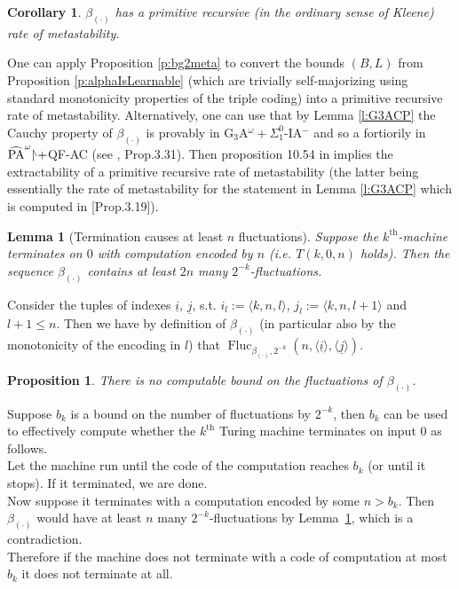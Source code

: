 \documentclass[1p]{elsarticle}
\newcommand{\res}{|\!\raisebox{1mm}{$\scriptscriptstyle\setminus$}}
\DeclareMathOperator{\Fluc}{Fluc}
\newcommand{\tup}{\underline} %
\theoremstyle{plain}
\newtheorem{lemma}[thm]{Lemma}
\newtheorem{prop}[thm]{Proposition}
\newtheorem{cor}[thm]{Corollary}
\theoremstyle{definition}
\theoremstyle{remark}
\renewenvironment{proof}[1][]{\noindent{\bf Proof{#1}. }}{\nopagebreak[4]{\hspace*{\fill}
  $\Box$              %
 }{\vspace{2ex}}}
\newcommand{\nbd}{\nobreakdash-}
\theoremstyle{definition}
\begin{document}
{\begin{cor} \label{metastability-alpha}
$\beta_{(\cdot)}$ has a primitive recursive (in the ordinary sense 
of Kleene) rate of metastability.
\end{cor}
\begin{proof} One can apply Proposition \ref{p:bg2meta} to convert 
the bounds $(B,L)$ from Proposition \ref{p:alphaIsLearnable} (which are 
trivially self-majorizing using standard monotonicity properties of the 
triple coding) into a primitive 
recursive rate of metastability. Alternatively, one can use that by 
Lemma \ref{l:G3ACP} the Cauchy property of $\beta_{(\cdot)}$ is provably in 
G$_3$A$^{\omega}+\Sigma^0_1$-IA$^-$ and so a fortiorily in 
$\widehat{\rm PA}^{\omega}\res+$QF-AC (see \cite{Kohlenbach(book)}, Prop.3.31).
Then proposition 10.54 in \cite{Kohlenbach(book)} implies the extractability 
of a primitive recursive rate of metastability (the latter being essentially 
the rate of metastability for the statement in Lemma \ref{l:G3ACP} 
which is computed in \cite{Kohlenbach(book)}[Prop.3.19]). 
\end{proof} 
\begin{lemma}[Termination causes at least $n$ fluctuations]\label{l:2n}
Suppose the $k^\text{th}$-machine terminates on $0$ with computation encoded by $n$ (i.e. $T(k,0,n)$ holds). Then the sequence $\beta_{(\cdot)}$ contains at 
least $2n$ many $2^{-k}$\nbd fluctuations.
\end{lemma}
\begin{proof}
Consider the tuples of indexes $\tup i$, $\tup j$, 
s.t. $i_l:=\langle k,n,l\rangle$, $j_l:=\langle k,n,l+1\rangle$ and $l+1\leq n$. Then we have by definition of $\beta_{(\cdot)}$ (in particular also by the monotonicity of the encoding in $l$) that
$
\Fluc_{\beta_{(\cdot)},2^{-k}}(n,\langle \tup i \rangle, \langle \tup j\rangle).
$
\end{proof}

\begin{prop}\label{p:alphaHasNoFlucBd}
There is no computable bound on the fluctuations of $\beta_{(\cdot)}$.
\end{prop}
\begin{proof}
Suppose $b_k$ is a bound on the number of fluctuations by $2^{-k}$, 
then $b_k$ can be used to effectively compute whether the $k^{\text{th}}$ Turing machine terminates on input $0$ as follows.\\
Let the machine run until the code of the computation reaches $b_k$ (or until it stops). If it terminated, we are done.\\
Now suppose it terminates with a computation encoded by some $n>b_k$. Then $\beta_{(\cdot)}$ would have at least $n$ many $2^{-k}$\nbd fluctuations by Lemma~\ref{l:2n}, which is a contradiction.\\
Therefore if the machine does not terminate with a code of computation at most $b_k$ it does not terminate at all.
\end{proof}



}
\end{document}
